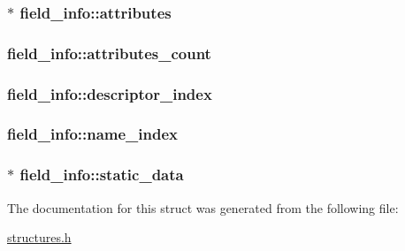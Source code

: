 \subsubsection[{\texorpdfstring{attributes}{attributes}}]{$\ast$ field\+\_\+info\+::attributes}\hypertarget{structfield__info_afdda114944ae5eaae78c237f99257108}{}\label{structfield__info_afdda114944ae5eaae78c237f99257108}
\subsubsection[{\texorpdfstring{attributes\+\_\+count}{attributes_count}}]{ field\+\_\+info\+::attributes\+\_\+count}\hypertarget{structfield__info_a83bfa4ff84a608e3dbd1c3968ebe1b80}{}\label{structfield__info_a83bfa4ff84a608e3dbd1c3968ebe1b80}
\subsubsection[{\texorpdfstring{descriptor\+\_\+index}{descriptor_index}}]{ field\+\_\+info\+::descriptor\+\_\+index}\hypertarget{structfield__info_a12dd492b7fb1d61da1ac14938d97b07f}{}\label{structfield__info_a12dd492b7fb1d61da1ac14938d97b07f}
\subsubsection[{\texorpdfstring{name\+\_\+index}{name_index}}]{ field\+\_\+info\+::name\+\_\+index}\hypertarget{structfield__info_a425e3ae85badd81c67ef00acca85ad9e}{}\label{structfield__info_a425e3ae85badd81c67ef00acca85ad9e}
\subsubsection[{\texorpdfstring{static\+\_\+data}{static_data}}]{$\ast$ field\+\_\+info\+::static\+\_\+data}\hypertarget{structfield__info_a90fc91c18e08fe2325cdeded20ee4578}{}\label{structfield__info_a90fc91c18e08fe2325cdeded20ee4578}


The documentation for this struct was generated from the following file\+:\begin{DoxyCompactItemize}
\item 
\hyperlink{structures_8h}{structures.\+h}\end{DoxyCompactItemize}
